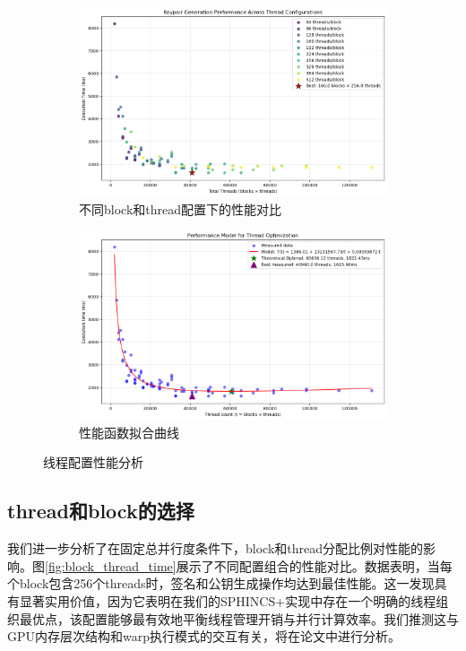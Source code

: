 \documentclass[report]{../../custom}
\begin{document}
\begin{figure}[h]
  \centering
  \begin{subfigure}{0.48\textwidth}
    \centering
    \includegraphics[width=\textwidth]{./fig/thread_time_cost.png}
    \caption{不同block和thread配置下的性能对比}
    \label{fig:thread_time_cost}
  \end{subfigure}
  \hfill
  \begin{subfigure}{0.48\textwidth}
    \centering
    \includegraphics[width=\textwidth]{./fig/approach.png}
    \caption{性能函数拟合曲线}
    \label{fig:approach}
  \end{subfigure}
  \caption{线程配置性能分析}
  \label{fig:performance}
\end{figure}

\subsection{thread和block的选择}

我们进一步分析了在固定总并行度条件下，block和thread分配比例对性能的影响。图\ref{fig:block_thread_time}展示了不同配置组合的性能对比。数据表明，当每个block包含256个threads时，签名和公钥生成操作均达到最佳性能。这一发现具有显著实用价值，因为它表明在我们的SPHINCS+实现中存在一个明确的线程组织最优点，该配置能够最有效地平衡线程管理开销与并行计算效率。我们推测这与GPU内存层次结构和warp执行模式的交互有关，将在论文中进行分析。
\end{document}
